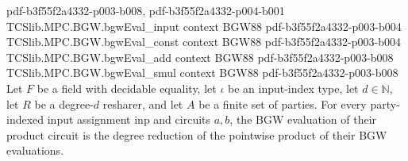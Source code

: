 \begin{theorem}
{    pdf-b3f55f2a4332-p003-b008,
    pdf-b3f55f2a4332-p004-b001}
\proofstep
  {TCSlib.MPC.BGW.bgwEval_input}
  {context}
  {BGW88}
  {pdf-b3f55f2a4332-p003-b004}
\proofstep
  {TCSlib.MPC.BGW.bgwEval_const}
  {context}
  {BGW88}
  {pdf-b3f55f2a4332-p003-b004}
\proofstep
  {TCSlib.MPC.BGW.bgwEval_add}
  {context}
  {BGW88}
  {pdf-b3f55f2a4332-p003-b008}
\proofstep
  {TCSlib.MPC.BGW.bgwEval_smul}
  {context}
  {BGW88}
  {pdf-b3f55f2a4332-p003-b008}
Let $F$ be a field with decidable equality, let $\iota$ be an input-index type, let
$d\in\mathbb N$, let $R$ be a degree-$d$ resharer, and let $A$ be a finite set of
parties. For every party-indexed input assignment $\mathrm{inp}$ and circuits $a,b$, the
BGW evaluation of their product circuit is the degree reduction of the pointwise product
of their BGW evaluations.
\end{theorem}

